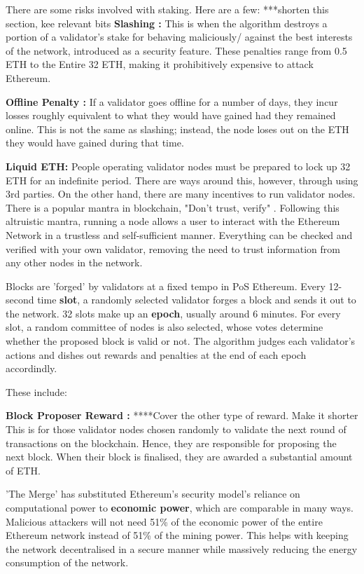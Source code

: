 There are some risks involved with staking. Here are a few:
 ***shorten this section, kee relevant bits
\textbf{Slashing :}
This is when the algorithm destroys a portion of a validator's stake for behaving maliciously/ against the best interests of the network, introduced as a security feature. These penalties range from 0.5 ETH to the Entire 32 ETH, making it prohibitively expensive to attack Ethereum. 

\textbf{Offline Penalty :}
If a validator goes offline for a number of days, they incur losses roughly equivalent to what they would have gained had they remained online. This is not the same as slashing; instead, the node loses out on the ETH they would have gained during that time.

\textbf{Liquid ETH: }
People operating validator nodes must be prepared to lock up 32 ETH for an indefinite period. There are ways around this, however, through using 3rd parties. 
\newline \newline
On the other hand, there are many incentives to run validator nodes. There is a popular mantra in blockchain, "Don't trust, verify" \cite{EthereumEthereum.org}. Following this altruistic mantra, running a node allows a user to interact with the Ethereum Network in a trustless and self-sufficient manner. Everything can be checked and verified with your own validator, removing the need to trust information from any other nodes in the network. 

Blocks are 'forged' by validators at a fixed tempo in PoS Ethereum. Every 12-second time \textbf{slot}, a randomly selected validator forges a block and sends it out to the network. 32 slots make up an \textbf{epoch}, usually around 6 minutes. For every slot, a random committee of nodes is also selected, whose votes determine whether the proposed block is valid or not. The algorithm judges each validator's actions and dishes out rewards and penalties at the end of each epoch accordindly. 


These include:

\textbf{Block Proposer Reward :}
****Cover the other type of reward. Make it shorter
This is for those validator nodes chosen randomly to validate the next round of transactions on the blockchain. Hence, they are responsible for proposing the next block. When their block is finalised, they are awarded a substantial amount of ETH.


'The Merge' has substituted Ethereum's security model's reliance on computational power to \textbf{economic power}, which are comparable in many ways. Malicious attackers will not need 51\% of the economic power of the entire Ethereum network instead of 51\% of the mining power. This helps with keeping the network decentralised in a secure manner while massively reducing the energy consumption of the network. 

